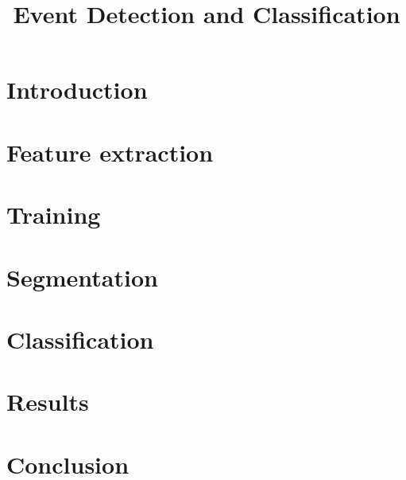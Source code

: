 \documentclass{article}
\title{Event Detection and Classification}
\begin{document}
\ninept
\maketitle

\begin{sloppy}

\begin{abstract}
    
\end{abstract}

\begin{keywords}

\end{keywords}

\section{Introduction}
\label{sec:intro}


\section{Feature extraction}
\label{sec:feature}


\section{Training}
\label{sec:training}


\section{Segmentation}
\label{sec:segmentation}


\section{Classification}
\label{sec:classification}


\section{Results}
\label{sec:results}


\section{Conclusion}
\label{sec:conclusion}




\end{sloppy}
\end{document}
